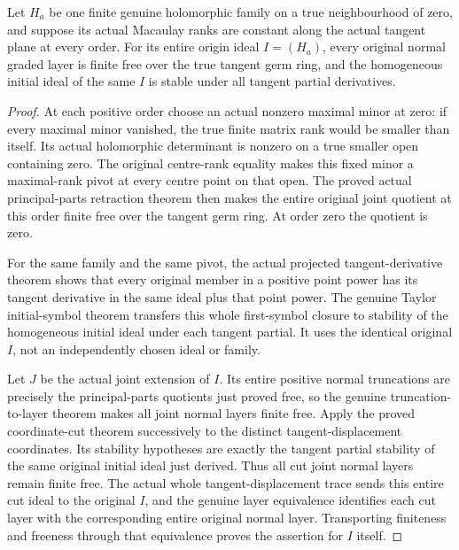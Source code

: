 \begin{theorem}
\label{hir:actual-supplied-flattening-family-coupled-normal-data}
\leanok
Let $H_a$ be one finite genuine holomorphic family on a true neighbourhood of zero, and suppose its actual Macaulay ranks are constant along the actual tangent plane at every order. For its entire origin ideal $I=(H_a)$, every original normal graded layer is finite free over the true tangent germ ring, and the homogeneous initial ideal of the same $I$ is stable under all tangent partial derivatives.
\end{theorem}
\begin{proof}
At each positive order choose an actual nonzero maximal minor at zero: if every maximal minor vanished, the true finite matrix rank would be smaller than itself. Its actual holomorphic determinant is nonzero on a true smaller open containing zero. The original centre-rank equality makes this fixed minor a maximal-rank pivot at every centre point on that open. The proved actual principal-parts retraction theorem then makes the entire original joint quotient at this order finite free over the tangent germ ring. At order zero the quotient is zero.

For the same family and the same pivot, the actual projected tangent-derivative theorem shows that every original member in a positive point power has its tangent derivative in the same ideal plus that point power. The genuine Taylor initial-symbol theorem transfers this whole first-symbol closure to stability of the homogeneous initial ideal under each tangent partial. It uses the identical original $I$, not an independently chosen ideal or family.

Let $J$ be the actual joint extension of $I$. Its entire positive normal truncations are precisely the principal-parts quotients just proved free, so the genuine truncation-to-layer theorem makes all joint normal layers finite free. Apply the proved coordinate-cut theorem successively to the distinct tangent-displacement coordinates. Its stability hypotheses are exactly the tangent partial stability of the same original initial ideal just derived. Thus all cut joint normal layers remain finite free. The actual whole tangent-displacement trace sends this entire cut ideal to the original $I$, and the genuine layer equivalence identifies each cut layer with the corresponding entire original normal layer. Transporting finiteness and freeness through that equivalence proves the assertion for $I$ itself.
\end{proof}

